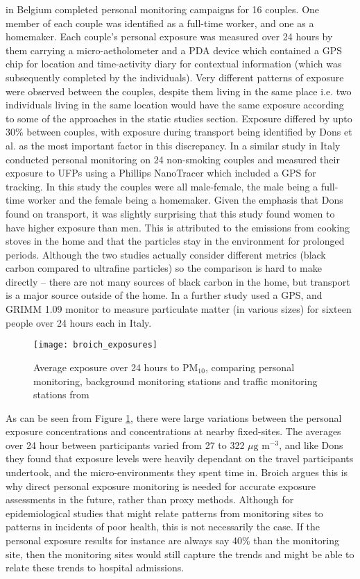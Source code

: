 \cite{Dons2011} in Belgium completed personal monitoring campaigns for 16 couples. One member of each couple was identified as a full-time worker, and one as a homemaker. Each couple's personal exposure was measured over 24 hours by them carrying a micro-aetholometer and a PDA device which contained a GPS chip for location and time-activity diary for contextual information (which was subsequently completed by the individuals). Very different patterns of exposure were observed between the couples, despite them living in the same place i.e. two individuals living in the same location would have the same exposure according to some of the approaches in the static studies section. Exposure differed by upto 30\% between couples, with exposure during transport being identified by Dons et al. as the most important factor in this discrepancy. In a similar study in Italy \cite{Buonanno2014} conducted personal monitoring on 24 non-smoking couples  and measured their exposure to UFPs using a Phillips NanoTracer which included a GPS for tracking. In this study the couples were all male-female, the male being a full-time worker and the female being a homemaker. Given the emphasis that Dons found on transport, it was slightly surprising that this study found women to have higher exposure than men. This is attributed to the emissions from cooking stoves in the home and that the particles stay in the environment for prolonged periods. Although the two studies actually consider different metrics (black carbon compared to ultrafine particles) so the comparison is hard to make directly -- there are not many sources of black carbon in the home, but transport is a major source outside of the home. In a further study \cite{Broich2011} used a GPS, and GRIMM 1.09 monitor to measure particulate matter (in various sizes) for sixteen people over 24 hours each in Italy.

\begin{figure}[H]
\centering
\texttt{[image: broich\_exposures]}
\caption{Average exposure over 24 hours to PM$_{10}$, comparing personal monitoring, background monitoring stations and traffic monitoring stations from \cite{Broich2011}}
\label{fig:broich_exposures}
\end{figure}

As can be seen from Figure \ref{fig:broich_exposures}, there were large variations between the personal exposure concentrations and concentrations at nearby fixed-sites. The averages over 24 hour between participants varied from 27 to 322 $\mu \text{g m}^{-3}$, and like Dons they found that exposure levels were heavily dependant on the travel participants undertook, and the micro-environments they spent time in. Broich argues this is why direct personal exposure monitoring is needed for accurate exposure assessments in the future, rather than proxy methods. Although for epidemiological studies that might relate patterns from monitoring sites to patterns in incidents of poor health, this is not necessarily the case. If the personal exposure results for instance are always say 40\% than the monitoring site, then the monitoring sites would still capture the trends and might be able to relate these trends to hospital admissions. 

